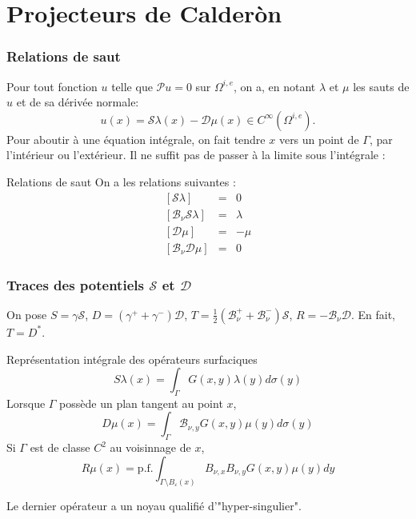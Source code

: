 \documentclass[11pt]{beamer}
\begin{document}
	\section{Projecteurs de Calderòn}
	\setcounter{subsection}{1}
	\begin{frame}
		\frametitle{Relations de saut}
		Pour tout fonction $u$ telle que $\mathcal{P}u = 0$ sur $\Omega^{i,e}$, on a, en notant $\lambda$ et $\mu$ les sauts de $u$ et de sa dérivée normale:
		\[ u(x) = \mathcal{S}\lambda(x) - \mathcal{D}\mu(x) \in C^{\infty}(\Omega^{i,e}).\]
		Pour aboutir à une équation intégrale, on fait tendre $x$ vers un point de $\Gamma$, par l'intérieur ou l'extérieur.
		\alert{Il ne suffit pas de passer à la limite sous l'intégrale} : 
		\begin{block}{Relations de saut}
			On a les relations suivantes :
			\vspace{-0.4cm}
			\begin{eqnarray*}
			\left[\mathcal{S}\lambda\right] &=& 0\\
			\left[\mathcal{B}_\nu\mathcal{S}\lambda\right] &=& \lambda\\
			\left[\mathcal{D}\mu\right] &=& -\mu\\
			\left[\mathcal{B}_\nu\mathcal{D}\mu\right] &=& 0
			\end{eqnarray*}
		\end{block}
	\end{frame}
	\begin{frame}
		\frametitle{Traces des potentiels $\mathcal{S}$ et $\mathcal{D}$}
	    On pose $S = \gamma \mathcal{S}$, $D = \left(\gamma^+ + \gamma^-\right)\mathcal{D}$, $T = \frac{1}{2}(\mathcal{B}_\nu^+ +  \mathcal{B}_\nu^- )\mathcal{S}$, $R = -\mathcal{B}_\nu\mathcal{D}$. En fait, $T = D^*$. 
		\begin{block}{Représentation intégrale des opérateurs surfaciques}
			\[S\lambda(x) = \int_{\Gamma} G(x,y) \lambda(y) d\sigma(y)\]
			Lorsque $\Gamma$ possède un plan tangent au point $x$, 
			\[D\mu(x) = \int_{\Gamma}\mathcal{B}_{\nu,y} G(x,y) \mu(y)d\sigma(y)\]
			Si $\Gamma$ est de classe $C^2$ au voisinnage de $x$, 
			\[R\mu(x) = \text{p.f.} \int_{\Gamma\setminus{B_\varepsilon}(x)}B_{\nu,x}B_{\nu,y}G(x,y) \mu(y) dy \]
		\end{block}
		Le dernier opérateur a un noyau qualifié d'"hyper-singulier". 
	\end{frame}
\end{document}
